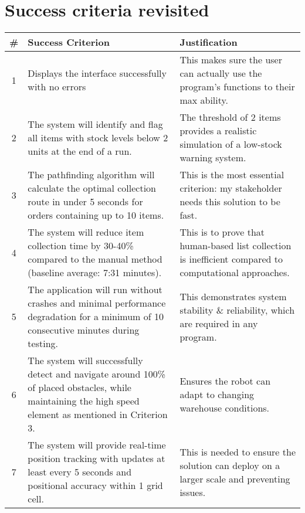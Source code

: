 \newpage





\newpage

\section{Success criteria revisited}

\begin{table}[htbp!]
	\centering
	\begin{tabularx}{\textwidth}{|c|X|X|}
		\hline
		\textbf{\#} & \textbf{Success Criterion} & \textbf{Justification} \\
		\hline
		1 & Displays the interface successfully with no errors & This makes sure the user can actually use the program's functions to their max ability. \\
		\hline
		2 & The system will identify and flag all items with stock levels below 2 units at the end of a run. & The threshold of 2 items provides a realistic simulation of a low-stock warning system. \\
		\hline
		3 & The pathfinding algorithm will calculate the optimal collection route in under 5 seconds for orders containing up to 10 items. & This is the most essential criterion: my stakeholder needs this solution to be fast. \\
		\hline
		4 & The system will reduce item collection time by 30-40\% compared to the manual method (baseline average: 7:31 minutes). & This is to prove that human-based list collection is inefficient compared to computational approaches. \\
		\hline
		5 & The application will run without crashes and minimal performance degradation for a minimum of 10 consecutive minutes during testing. & This demonstrates system stability \& reliability, which are required in any program. \\
		\hline
		6 & The system will successfully detect and navigate around 100\% of placed obstacles, while maintaining the high speed element as mentioned in Criterion 3. & Ensures the robot can adapt to changing warehouse conditions. \\
		\hline
		7 & The system will provide real-time position tracking with updates at least every 5 seconds and positional accuracy within 1 grid cell. & This is needed to ensure the solution can deploy on a larger scale and preventing issues. \\

\end{tabularx}
\end{table}
